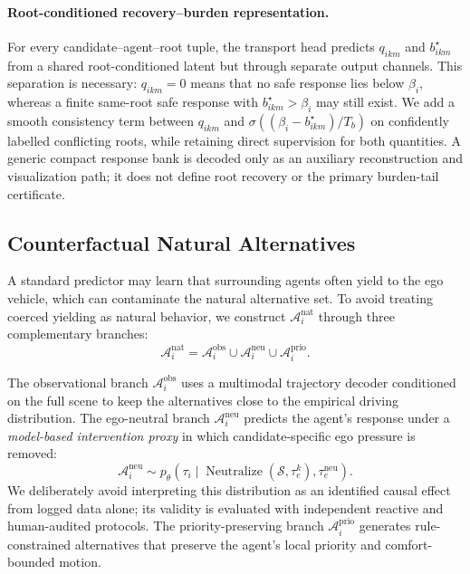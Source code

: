 \documentclass[10pt]{article}
\begin{document}
\paragraph{Root-conditioned recovery--burden representation.}
For every candidate--agent--root tuple, the transport head predicts $q_{ikm}$ and $b^\star_{ikm}$ from a shared root-conditioned latent but through separate output channels.  This separation is necessary: $q_{ikm}=0$ means that no safe response lies below $\beta_i$, whereas a finite same-root safe response with $b^\star_{ikm}>\beta_i$ may still exist.  We add a smooth consistency term between $q_{ikm}$ and $\sigma((\beta_i-b^\star_{ikm})/T_b)$ on confidently labelled conflicting roots, while retaining direct supervision for both quantities.  A generic compact response bank is decoded only as an auxiliary reconstruction and visualization path; it does not define root recovery or the primary burden-tail certificate.

\subsection{Counterfactual Natural Alternatives}
\label{sec:method_counterfactual}

A standard predictor may learn that surrounding agents often yield to the ego vehicle, which can contaminate the natural alternative set. To avoid treating coerced yielding as natural behavior, we construct $\mathcal{A}^{\mathrm{nat}}_i$ through three complementary branches:
\begin{equation}
    \mathcal{A}^{\mathrm{nat}}_i
    =
    \mathcal{A}^{\mathrm{obs}}_i
    \cup
    \mathcal{A}^{\mathrm{neu}}_i
    \cup
    \mathcal{A}^{\mathrm{prio}}_i .
    \label{eq:natural_union}
\end{equation}

The observational branch $\mathcal{A}^{\mathrm{obs}}_i$ uses a multimodal trajectory decoder conditioned on the full scene to keep the alternatives close to the empirical driving distribution. The ego-neutral branch $\mathcal{A}^{\mathrm{neu}}_i$ predicts the agent's response under a \emph{model-based intervention proxy} in which candidate-specific ego pressure is removed:
\begin{equation}
    \mathcal{A}^{\mathrm{neu}}_i
    \sim
    p_\theta\!\left(\tau_i \mid \operatorname{Neutralize}(\mathcal{S},\tau_e^k),\tau^{\mathrm{neu}}_e\right).
\end{equation}
We deliberately avoid interpreting this distribution as an identified causal effect from logged data alone; its validity is evaluated with independent reactive and human-audited protocols. The priority-preserving branch $\mathcal{A}^{\mathrm{prio}}_i$ generates rule-constrained alternatives that preserve the agent's local priority and comfort-bounded motion.
\end{document}
